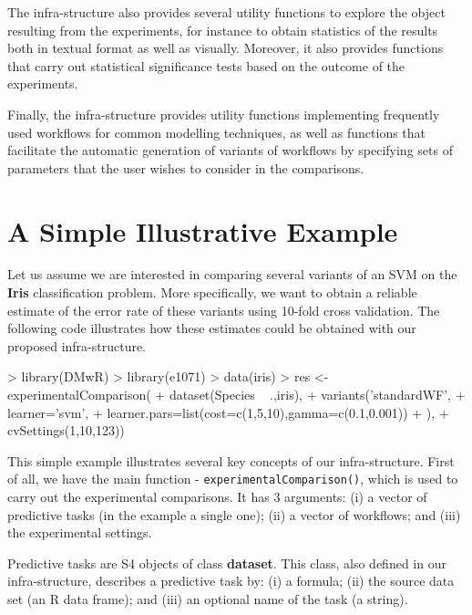 \documentclass[10pt,a4paper]{article}
\begin{document}
The infra-structure also provides several utility functions
to explore the object resulting from the experiments, for instance to
obtain statistics of the results both in textual format as well as
visually. Moreover, it also provides functions that carry out
statistical significance tests based on the outcome of the
experiments. 

Finally, the infra-structure provides utility functions
implementing frequently used workflows for common modelling techniques, as
well as functions that facilitate the automatic generation of variants
of workflows by specifying sets of parameters that the user wishes to
consider in the comparisons.

\section{A Simple Illustrative Example}\label{sec:simpleEx}

Let us assume we are interested in comparing several variants of
an SVM on the
\textbf{Iris} classification problem. More specifically, we want to
obtain a reliable estimate of the error rate of these variants using
10-fold cross validation. The following code illustrates how these
estimates could be obtained with our proposed infra-structure.

\begin{Schunk}
\begin{Sinput}
> library(DMwR)
> library(e1071)
> data(iris)
> res <- experimentalComparison(
+          dataset(Species ~ .,iris),
+          variants('standardWF',
+                   learner='svm',
+                   learner.pars=list(cost=c(1,5,10),gamma=c(0.1,0.001))
+                  ),
+          cvSettings(1,10,123))
\end{Sinput}
\end{Schunk}

This simple example illustrates several key concepts of our
infra-structure. First of all, we have the main function  -
\texttt{experimentalComparison()}, which is used to carry out
the experimental comparisons. It has 3 arguments: (i) a vector of
predictive tasks (in the example a single one); (ii) a vector of workflows; and (iii) the
experimental settings. 

Predictive tasks are S4 objects of class
\textbf{dataset}. This class, also defined in our infra-structure,
describes a predictive task by: (i) a formula; (ii) the source data
set (an R data frame); and (iii) an optional name of the task (a
string). 
\end{document}
